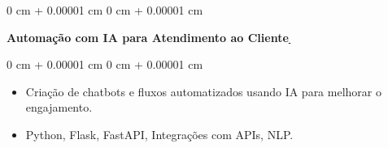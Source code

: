\documentclass[10pt, letterpaper]{article}
\newenvironment{highlights}{
    \begin{itemize}[
        topsep=0.10 cm,
        parsep=0.10 cm,
        partopsep=0pt,
        itemsep=0pt,
        leftmargin=0 cm + 10pt
    ]
}{
    \end{itemize}
}
\newenvironment{onecolentry}{
    \begin{adjustwidth}{
        0 cm + 0.00001 cm
    }{
        0 cm + 0.00001 cm
    }
}{
    \end{adjustwidth}
}
\begin{document}
\vspace{0.2cm}

    \begin{onecolentry}
        \textbf{Automação com IA para Atendimento ao Cliente}\href{}{\, \faGithub}
    \end{onecolentry}
    \vspace{0.10cm}
    \begin{onecolentry}
        \begin{highlights}
                    \item Criação de chatbots e fluxos automatizados usando IA para melhorar o engajamento.
                \item Python, Flask, FastAPI, Integrações com APIs, NLP.
        \end{highlights}
    \end{onecolentry}
    
\end{document}
